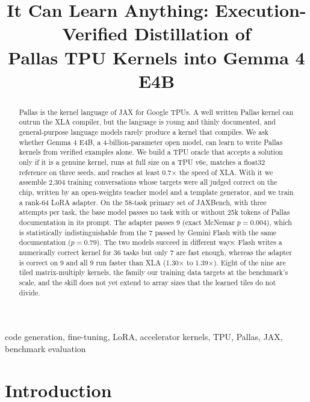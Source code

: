 \documentclass[conference]{IEEEtran}
\newcommand{\x}{$\times$}
\begin{document}
\title{It Can Learn Anything: Execution-Verified Distillation of\\ Pallas TPU Kernels into Gemma 4 E4B}

\author{
}

\maketitle

\begin{abstract}
Pallas is the kernel language of JAX for Google TPUs. A well written Pallas kernel can outrun the XLA compiler, but the language
is young and thinly documented, and general-purpose language models rarely produce a kernel that compiles. We ask whether
Gemma 4 E4B, a 4-billion-parameter open model, can learn to write Pallas kernels from verified examples alone. We build a TPU
oracle that accepts a solution only if it is a genuine kernel, runs at full size on a TPU v6e, matches a float32 reference on
three seeds, and reaches at least 0.7\x{} the speed of XLA. With it we assemble 2,304 training conversations whose targets were
all judged correct on the chip, written by an open-weights teacher model and a template generator, and we train a rank-64 LoRA
adapter. On the 58-task primary set of JAXBench, with three attempts per task, the base model passes no task with or without
25k tokens of Pallas documentation in its prompt. The adapter passes 9 (exact McNemar $p = 0.004$), which is statistically
indistinguishable from the 7 passed by Gemini Flash with the same documentation ($p = 0.79$). The two models succeed in different
ways: Flash writes a numerically correct kernel for 36 tasks but only 7 are fast enough, whereas the adapter is correct on 9 and
all 9 run faster than XLA (1.30\x{} to 1.39\x{}). Eight of the nine are tiled matrix-multiply kernels, the family our training
data targets at the benchmark's scale, and the skill does not yet extend to array sizes that the learned tiles do not divide.
\end{abstract}

\begin{IEEEkeywords}
code generation, fine-tuning, LoRA, accelerator kernels, TPU, Pallas, JAX, benchmark evaluation
\end{IEEEkeywords}

\section{Introduction}
\end{document}

